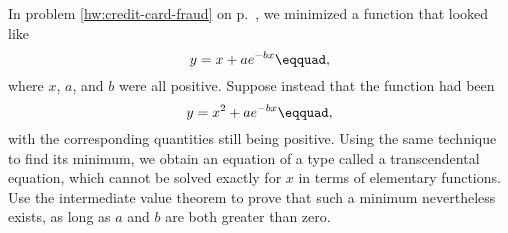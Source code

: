 In problem \ref{hw:credit-card-fraud} on p.~\pageref{hw:credit-card-fraud},
we minimized a function that looked like
\begin{equation*}
  y = x+ae^{-bx}\eqquad,
\end{equation*}
where $x$, $a$, and $b$ were all positive. Suppose instead that
the function had been
\begin{equation*}
  y = x^2+ae^{-bx}\eqquad,
\end{equation*}
with the corresponding quantities still being positive.
Using the same technique to find its minimum, we obtain an equation
of a type called a transcendental equation, which cannot be solved
exactly for $x$ in terms of elementary functions. Use the intermediate value
theorem to prove that such a minimum nevertheless exists, as long as $a$ and
$b$ are both greater than zero.
